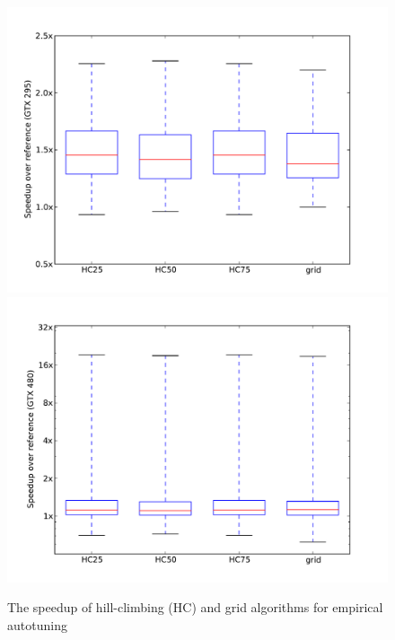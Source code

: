 \documentclass{sig-alternate}
\begin{document}
\begin{figure}
\centering
\includegraphics[scale=.42]{fig_genX_vader_295.pdf}
\includegraphics[scale=.42]{fig_genX_munctional0_480.pdf}
\caption{The speedup of hill-climbing (HC) and grid algorithms for empirical autotuning}
\label{fig:speedup}
\end{figure}
\end{document}
